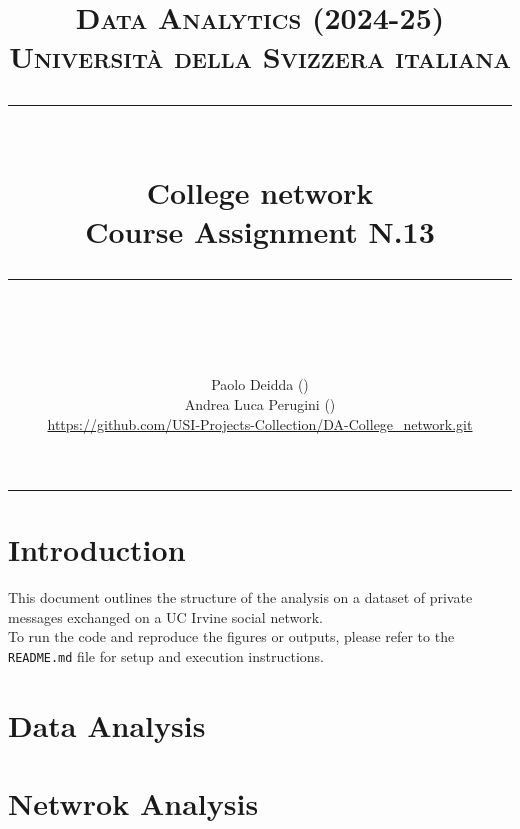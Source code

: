 \documentclass{article}
\title{
	\normalfont\normalsize
	\textsc{Data Analytics (2024-25)\\
	Universit\`a della Svizzera italiana}\\
	\rule{\linewidth}{0.5pt}\\
	{\huge College network\\
	\small Course Assignment N.13}\\
	\rule{\linewidth}{1pt}\\
	\vspace{5pt}
}
\author{
	Paolo Deidda (\text{paolo.deidda@usi.ch}) \\ 
	Andrea Luca Perugini (\text{andrea.perugini@usi.ch})\\
	\url{https://github.com/USI-Projects-Collection/DA-College_network.git}
	}
\begin{document}
\maketitle

\tableofcontents

\vspace{100pt}
\rule{\linewidth}{1pt}

\section*{Introduction}
This document outlines the structure of the analysis on a dataset of private messages exchanged on a UC Irvine social network.\\

To run the code and reproduce the figures or outputs, please refer to the \texttt{README.md} file for setup and execution instructions.
\newpage

\section{Data Analysis}


\newpage

\section{Netwrok Analysis}

\end{document}
